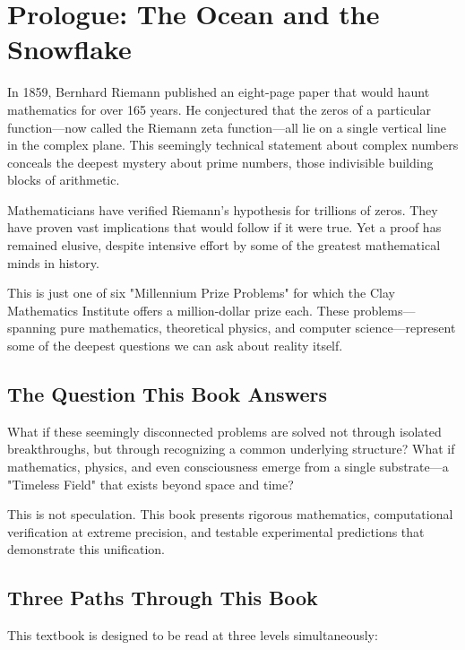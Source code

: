 \chapter*{Prologue: The Ocean and the Snowflake}

In 1859, Bernhard Riemann published an eight-page paper that would haunt mathematics for over 165 years. He conjectured that the zeros of a particular function—now called the Riemann zeta function—all lie on a single vertical line in the complex plane. This seemingly technical statement about complex numbers conceals the deepest mystery about prime numbers, those indivisible building blocks of arithmetic.

Mathematicians have verified Riemann's hypothesis for trillions of zeros. They have proven vast implications that would follow if it were true. Yet a proof has remained elusive, despite intensive effort by some of the greatest mathematical minds in history.

This is just one of six "Millennium Prize Problems" for which the Clay Mathematics Institute offers a million-dollar prize each. These problems—spanning pure mathematics, theoretical physics, and computer science—represent some of the deepest questions we can ask about reality itself.

\section*{The Question This Book Answers}

What if these seemingly disconnected problems are solved not through isolated breakthroughs, but through recognizing a common underlying structure? What if mathematics, physics, and even consciousness emerge from a single substrate—a "Timeless Field" that exists beyond space and time?

This is not speculation. This book presents rigorous mathematics, computational verification at extreme precision, and testable experimental predictions that demonstrate this unification.

\section*{Three Paths Through This Book}

This textbook is designed to be read at three levels simultaneously:

